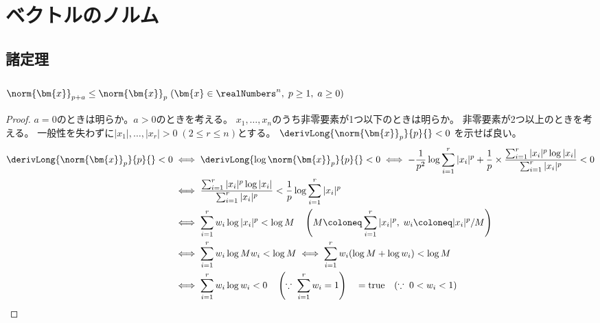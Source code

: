 \chapter{ベクトルのノルム}
    \section{諸定理}
        \subsection{\texorpdfstring{$\norm{\bm{x}}_{p+a} \leq \norm{\bm{x}}_p\;(\bm{x}\in\realNumbers^n,\;p\geq 1,\;a\geq 0)$}{||x||\_\{p+a\} ≦ ||x||\_p (x∈R\string^n, p≧1, a≧0)}}
            \begin{proof}
                \quad\par
                $a=0$のときは明らか。$a>0$のときを考える。
                $x_1,\dotsc,x_n$のうち非零要素が1つ以下のときは明らか。
                非零要素が2つ以上のときを考える。
                一般性を失わずに$|x_1|,\dotsc,|x_r|>0\;(2\leq r\leq n)$とする。
                $\derivLong{\norm{\bm{x}}_p}{p}{} < 0$ を示せば良い。
                \begin{align*}
                    \derivLong{\norm{\bm{x}}_p}{p}{} < 0 &\iff \derivLong{\log \norm{\bm{x}}_p}{p}{} < 0 \iff -\frac{1}{p^2}\log \sum_{i=1}^r |x_i|^p + \frac{1}{p}\times\frac{\sum_{i=1}^r |x_i|^p\log |x_i|}{\sum_{i=1}^r |x_i|^p} < 0 \\
                    &\iff \frac{\sum_{i=1}^r |x_i|^p\log |x_i|}{\sum_{i=1}^r |x_i|^p} < \frac{1}{p}\log \sum_{i=1}^r |x_i|^p \\
                    &\iff \sum_{i=1}^r w_i\log |x_i|^p < \log M \quad \left( M \coloneq \sum_{i=1}^r |x_i|^p,\; w_i \coloneq |x_i|^p/M \right) \\
                    &\iff \sum_{i=1}^r w_i\log M w_i < \log M \iff \sum_{i=1}^r w_i(\log M + \log w_i) < \log M \\
                    &\iff \sum_{i=1}^r w_i\log w_i < 0 \quad \left( \because\;\sum_{i=1}^r w_i = 1 \right) \quad = \text{true} \quad (\because\; 0<w_i<1)
                \end{align*}
            \end{proof}
